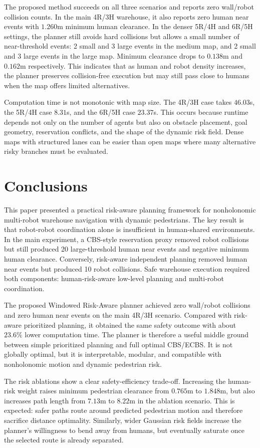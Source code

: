 \documentclass[10pt,twocolumn,letterpaper]{article}
\begin{document}
The proposed method succeeds on all three scenarios and reports zero wall/robot collision counts. In the main 4R/3H warehouse, it also reports zero human near events with $1.260$m minimum human clearance. In the denser 5R/4H and 6R/5H settings, the planner still avoids hard collisions but allows a small number of near-threshold events: 2 small and 3 large events in the medium map, and 2 small and 3 large events in the large map. Minimum clearance drops to $0.138$m and $0.162$m respectively. This indicates that as human and robot density increases, the planner preserves collision-free execution but may still pass close to humans when the map offers limited alternatives.

Computation time is not monotonic with map size. The 4R/3H case takes $46.03$s, the 5R/4H case $8.31$s, and the 6R/5H case $23.37$s. This occurs because runtime depends not only on the number of agents but also on obstacle placement, goal geometry, reservation conflicts, and the shape of the dynamic risk field. Dense maps with structured lanes can be easier than open maps where many alternative risky branches must be evaluated.

\section{Conclusions}
This paper presented a practical risk-aware planning framework for nonholonomic multi-robot warehouse navigation with dynamic pedestrians. The key result is that robot-robot coordination alone is insufficient in human-shared environments. In the main experiment, a CBS-style reservation proxy removed robot collisions but still produced 20 large-threshold human near events and negative minimum human clearance. Conversely, risk-aware independent planning removed human near events but produced 10 robot collisions. Safe warehouse execution required both components: human-risk-aware low-level planning and multi-robot coordination.

The proposed Windowed Risk-Aware planner achieved zero wall/robot collisions and zero human near events on the main 4R/3H scenario. Compared with risk-aware prioritized planning, it obtained the same safety outcome with about $23.6\%$ lower computation time. The planner is therefore a useful middle ground between simple prioritized planning and full optimal CBS/ECBS. It is not globally optimal, but it is interpretable, modular, and compatible with nonholonomic motion and dynamic pedestrian risk.

The risk ablations show a clear safety-efficiency trade-off. Increasing the human-risk weight raises minimum pedestrian clearance from $0.765$m to $1.848$m, but also increases path length from $7.13$m to $8.22$m in the ablation scenario. This is expected: safer paths route around predicted pedestrian motion and therefore sacrifice distance optimality. Similarly, wider Gaussian risk fields increase the planner's willingness to bend away from humans, but eventually saturate once the selected route is already separated.
\end{document}
